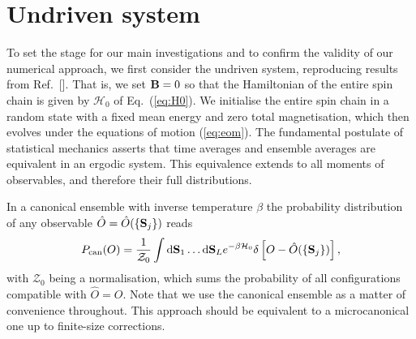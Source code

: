 \documentclass[aps,pre,twocolumn,notitlepage,floats,10pt]{revtex4-1}
\def\d{\mathrm{d}}
\newcommand{\be}{\begin{equation}}
\newcommand{\ee}{\end{equation}}
\begin{document}
\section{Undriven system}\label{sec:undriven}
To set the stage for our main investigations and to confirm the validity of our
numerical approach, we first consider the undriven system, reproducing results
from Ref.~[].
That is, we set ${\bf B} = 0$ so that the Hamiltonian of the entire spin chain
is given by $\mathcal{H}_0$ of Eq.~(\ref{eq:H0}). 
We initialise the entire spin chain in a random state with a fixed mean energy
and zero total magnetisation, which then evolves under the equations of motion
(\ref{eq:eom}).
The fundamental postulate of statistical mechanics asserts that time averages
and ensemble averages are equivalent in an ergodic system.
This equivalence extends to all moments of observables, and therefore their full
distributions.

In a canonical ensemble with inverse temperature $\beta$ the probability
distribution of any observable $\hat{O} = \hat{O}(\{ {\bf S}_j \})$ reads
\be
P_{\rm can}(O) = \frac{1}{\mathcal{Z}_0} \int \d{\bf S}_1 \ldots \d{\bf S}_L
e^{-\beta \mathcal{H}_0} \delta\left[O - \hat{O}(\{ {\bf S}_j \})\right],
\label{eq:canonP}
\ee
with $\mathcal{Z}_0$ being a normalisation, which sums the probability of all
configurations compatible with $\hat{O}=O$.
Note that we use the canonical ensemble as a matter of convenience throughout.
This approach should be equivalent to a microcanonical one up to finite-size
corrections.
\end{document}

